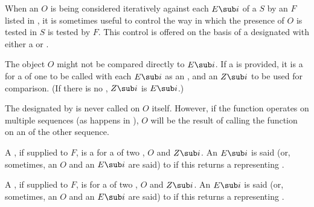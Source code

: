 

When an  $O$ is being considered iteratively 
against each  $E\sub i$
of a  $S$
by an  $F$ listed in \thenextfigure,
it is sometimes useful to control the way in which the presence of $O$ 
is tested in $S$ is tested by $F$.
This control is offered on the basis of a  designated with 
either a  or  .


The object $O$ might not be compared directly to $E\sub i$.
If a   is provided,
it is a  for a  of one  
to be called with each $E\sub i$ as an , 
and  an  $Z\sub i$ to be used for comparison.
(If there is no  , $Z\sub i$ is $E\sub i$.)

The  designated by  is never called on $O$ itself.
However, if the function operates on multiple sequences
(\eg as happens in ), $O$
will be the result of calling the  function on an
 of the other sequence.  

A  , if supplied to $F$,
is a  for a  
of two , $O$ and $Z\sub i$.
An $E\sub i$ is said (or, sometimes, an $O$ and an $E\sub i$ are said)
to  
if this   returns a  representing 
.

A  , if supplied to $F$, 
is  for a  
of two , $O$ and $Z\sub i$.
An $E\sub i$ is said (or, sometimes, an $O$ and an $E\sub i$ are said)
to  
if this  
returns a  representing .

